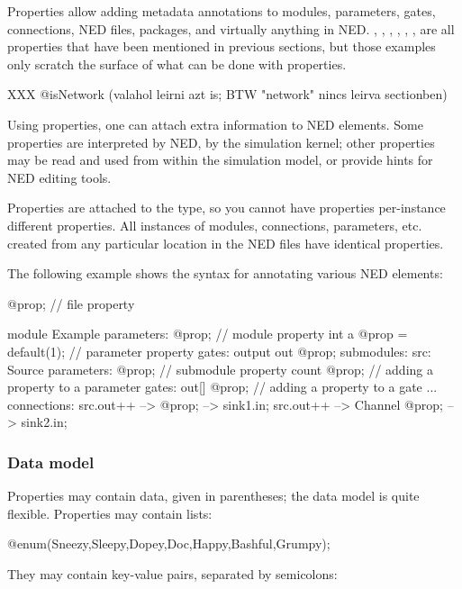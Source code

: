 Properties allow adding metadata annotations to modules, parameters, gates,
connections, NED files, packages, and virtually anything in NED.
, , , , ,
,  are all properties that have been mentioned in
previous sections, but those examples only scratch the surface of what can
be done with properties.

XXX @isNetwork (valahol leirni azt is; BTW "network" nincs leirva sectionben)

Using properties, one can attach extra information to NED elements. Some
properties are interpreted by NED, by the simulation kernel; other
properties may be read and used from within the simulation model, or
provide hints for NED editing tools.

Properties are attached to the type, so you cannot have properties
per-instance different properties. All instances of modules, connections,
parameters, etc. created from any particular location in the NED files have
identical properties.

The following example shows the syntax for annotating various NED elements:

\begin{ned}
@prop;  // file property

module Example
{
    parameters:
       @prop;   // module property
       int a @prop = default(1); // parameter property
    gates:
       output out @prop;
    submodules:
       src: Source {
           parameters:
              @prop;  // submodule property
              count @prop;  // adding a property to a parameter
           gates:
              out[] @prop;  // adding a property to a gate
       }
       ...
    connections:
       src.out++ --> { @prop; } --> sink1.in;
       src.out++ --> Channel { @prop; } --> sink2.in;
}
\end{ned}


\subsubsection{Data model}

Properties may contain data, given in parentheses; the data model is quite
flexible. Properties may contain lists:

\begin{ned}
@enum(Sneezy,Sleepy,Dopey,Doc,Happy,Bashful,Grumpy);
\end{ned}

They may contain key-value pairs, separated by semicolons:

